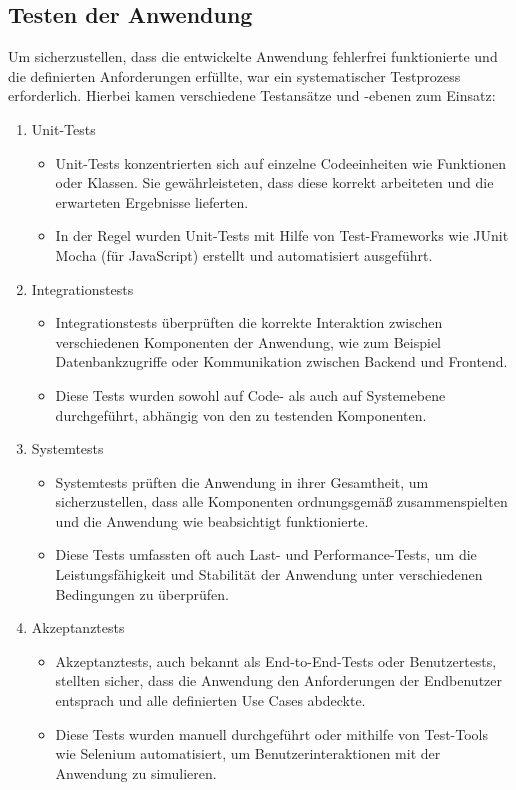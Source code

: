 \begin{flushleft}
\subsection{Testen der Anwendung}
Um sicherzustellen, dass die entwickelte Anwendung fehlerfrei funktionierte und die definierten Anforderungen erfüllte, war ein systematischer Testprozess erforderlich. Hierbei kamen verschiedene Testansätze und -ebenen zum Einsatz:

\begin{enumerate}
\item Unit-Tests
\begin{itemize}
\item Unit-Tests konzentrierten sich auf einzelne Codeeinheiten wie Funktionen oder Klassen. Sie gewährleisteten, dass diese korrekt arbeiteten und die erwarteten Ergebnisse lieferten.
\item In der Regel wurden Unit-Tests mit Hilfe von Test-Frameworks wie JUnit Mocha (für JavaScript) erstellt und automatisiert ausgeführt.
\end{itemize}
\item Integrationstests
\begin{itemize}
\item Integrationstests überprüften die korrekte Interaktion zwischen verschiedenen Komponenten der Anwendung, wie zum Beispiel Datenbankzugriffe oder Kommunikation zwischen Backend und Frontend.
\item Diese Tests wurden sowohl auf Code- als auch auf Systemebene durchgeführt, abhängig von den zu testenden Komponenten.
\end{itemize}
\item Systemtests
\begin{itemize}
\item Systemtests prüften die Anwendung in ihrer Gesamtheit, um sicherzustellen, dass alle Komponenten ordnungsgemäß zusammenspielten und die Anwendung wie beabsichtigt funktionierte.
\item Diese Tests umfassten oft auch Last- und Performance-Tests, um die Leistungsfähigkeit und Stabilität der Anwendung unter verschiedenen Bedingungen zu überprüfen.
\end{itemize}
\item Akzeptanztests
\begin{itemize}
\item Akzeptanztests, auch bekannt als End-to-End-Tests oder Benutzertests, stellten sicher, dass die Anwendung den Anforderungen der Endbenutzer entsprach und alle definierten Use Cases abdeckte.
\item Diese Tests wurden manuell durchgeführt oder mithilfe von Test-Tools wie Selenium automatisiert, um Benutzerinteraktionen mit der Anwendung zu simulieren.
\end{itemize}
\end{enumerate}


\end{flushleft}
